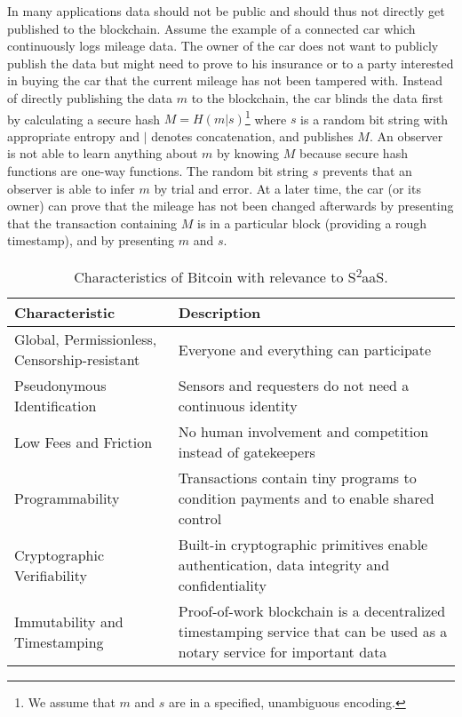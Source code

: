 In many applications data should not be public and should thus not directly get published to the blockchain. Assume the example of a connected car which continuously logs mileage data. The owner of the car does not want to publicly publish the data but might need to prove to his insurance or to a party interested in buying the car that the current mileage has not been tampered with. Instead of directly publishing the data $m$ to the blockchain, the car blinds the data first by calculating a secure hash $M=H(m|s)$\footnote{We assume that $m$ and $s$ are in a specified, unambiguous encoding.} where $s$ is a random bit string with appropriate entropy and $|$ denotes concatenation, and publishes $M$. An observer is not able to learn anything about $m$ by knowing $M$ because secure hash functions are one-way functions. The random bit string $s$ prevents that an observer is able to infer $m$ by trial and error. At a later time, the car (or its owner) can prove that the mileage has not been changed afterwards by presenting that the transaction containing $M$ is in a particular block (providing a rough timestamp), and by presenting $m$ and $s$. 

\begin{table}\footnotesize
  \centering
  \begin{tabularx}{\textwidth}{ p{2.5cm}  X }
    \toprule
    Characteristic & Description \\
    \midrule
    Global, Permissionless, Censorship-resistant & Everyone and everything can participate \\ 
    Pseudonymous Identification & Sensors and requesters do not need a continuous identity  \\ 
    Low Fees and Friction & No human involvement and competition instead of gatekeepers \\  
    Programmability & Transactions contain tiny programs to condition payments and to enable shared control \\  
    Cryptographic Verifiability & Built-in cryptographic primitives enable authentication, data integrity and confidentiality \\ 
    Immutability and Timestamping & Proof-of-work blockchain is a decentralized timestamping service that can be used as a notary service for important data \\
    \bottomrule
  \end{tabularx}
  \caption{Characteristics of Bitcoin with relevance to S\textsuperscript{2}aaS.}
  \label{tbl:sensors}
\end{table}

